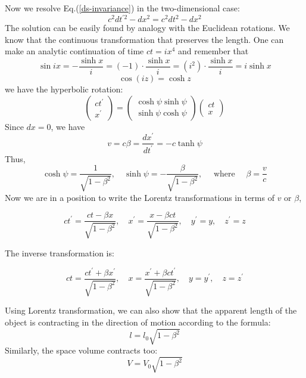 Now we resolve Eq.(\ref{ds-invariance}) in the two-dimensional case:
$$
c^{2} d t^{\prime 2}-d x^{2}=c^{2} d t^{2}-d x^{2}
$$
The solution can be easily found by analogy with the Euclidean rotations. We know that the continuous transformation that preserves the length. One can make an analytic continuation of time $ct=ix^4$ and remember that 
$$
\sin i x=-\frac{\sinh x}{i}=(-1) \cdot \frac{\sinh x}{i}=\left(i^{2}\right) \cdot \frac{\sinh x}{i}=i \sinh x
$$
$$
\cos (i z)=\cosh z
$$
we have the hyperbolic rotation:
\begin{equation}
\left(\begin{array}{c}
{c t^{\prime}} \\
{x^{\prime}}
\end{array}\right)=\left(\begin{array}{c}
{\cosh \psi \sinh \psi} \\
{\sinh \psi \cosh \psi}
\end{array}\right)\left(\begin{array}{l}
{c t} \\
{x}
\end{array}\right)
\end{equation}
Since $dx=0$, we have
$$
v=c \beta=\frac{d x^{\prime}}{d t^{\prime}}=-c \tanh \psi
$$
Thus,
$$
\cosh \psi=\frac{1}{\sqrt{1-\beta^{2}}}, \quad \sinh \psi=-\frac{\beta}{\sqrt{1-\beta^{2}}}, \quad \text { where } \quad \beta=\frac{v}{c}
$$
Now we are in a position to write the Lorentz transformations in terms of $v$ or $\beta$,
\begin{qt}
    \begin{equation}
c t^{\prime}=\frac{c t-\beta x}{\sqrt{1-\beta^{2}}}, \quad x^{\prime}=\frac{x-\beta c t}{\sqrt{1-\beta^{2}}}, \quad y^{\prime}=y, \quad z^{\prime}=z
\label{lorentz-trans}
\end{equation}
\end{qt}
The inverse transformation is:
\begin{qt}
    \begin{equation}
c t=\frac{c t^{\prime}+\beta x^{\prime}}{\sqrt{1-\beta^{2}}}, \quad x=\frac{x^{\prime}+\beta c t^{\prime}}{\sqrt{1-\beta^{2}}}, \quad y=y^{\prime}, \quad z=z^{\prime}
\label{inverse-lorentz}
\end{equation}
\end{qt}
Using Lorentz transformation, we can also show that the apparent length of the object is contracting in the direction of motion according to the formula:
\begin{equation}
l=l_{0} \sqrt{1-\beta^{2}}
\label{relativistic-length}
\end{equation}
Similarly, the space volume contracts too:
\begin{equation}
V=V_{0} \sqrt{1-\beta^{2}}
\label{relactivistic-volume}
\end{equation}

